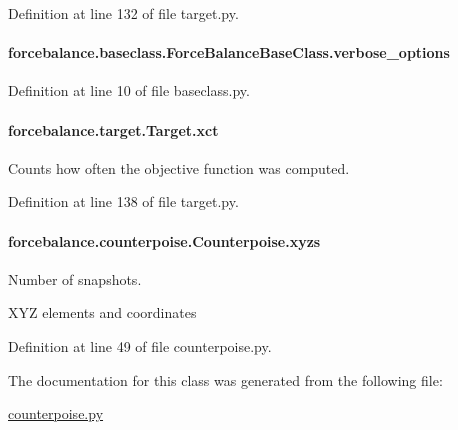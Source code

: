 Definition at line 132 of file target.\-py.

\hypertarget{classforcebalance_1_1baseclass_1_1ForceBalanceBaseClass_a8088e1e20cbd6bc175fb9c9fe9fa0f18}{
\paragraph[{verbose\-\_\-options}]{\setlength{\rightskip}{0pt plus 5cm}forcebalance.\-baseclass.\-Force\-Balance\-Base\-Class.\-verbose\-\_\-options\hspace{0.3cm}{\ttfamily [inherited]}}}\label{classforcebalance_1_1baseclass_1_1ForceBalanceBaseClass_a8088e1e20cbd6bc175fb9c9fe9fa0f18}


Definition at line 10 of file baseclass.\-py.

\hypertarget{classforcebalance_1_1target_1_1Target_aad2e385cfbf7b4a68f1c2cb41133fe82}{
\paragraph[{xct}]{\setlength{\rightskip}{0pt plus 5cm}forcebalance.\-target.\-Target.\-xct\hspace{0.3cm}{\ttfamily [inherited]}}}\label{classforcebalance_1_1target_1_1Target_aad2e385cfbf7b4a68f1c2cb41133fe82}


Counts how often the objective function was computed. 



Definition at line 138 of file target.\-py.

\hypertarget{classforcebalance_1_1counterpoise_1_1Counterpoise_a2793b896bff71a3c6b9c6f6568ba1be2}{
\paragraph[{xyzs}]{\setlength{\rightskip}{0pt plus 5cm}forcebalance.\-counterpoise.\-Counterpoise.\-xyzs}}\label{classforcebalance_1_1counterpoise_1_1Counterpoise_a2793b896bff71a3c6b9c6f6568ba1be2}


Number of snapshots. 

X\-Y\-Z elements and coordinates 

Definition at line 49 of file counterpoise.\-py.



The documentation for this class was generated from the following file\-:\begin{DoxyCompactItemize}
\item 
\hyperlink{counterpoise_8py}{counterpoise.\-py}\end{DoxyCompactItemize}
